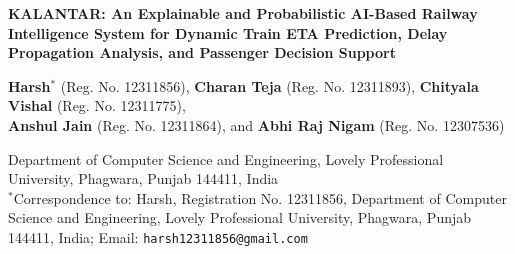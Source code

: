 \documentclass[11pt,a4paper]{article}
\begin{document}
\begin{center}
    {\LARGE \textbf{KALANTAR: An Explainable and Probabilistic AI-Based Railway Intelligence System for Dynamic Train ETA Prediction, Delay Propagation Analysis, and Passenger Decision Support}}
    \vspace{1.0em}

    \textbf{Harsh}$^{*}$ (Reg. No. 12311856), \textbf{Charan Teja} (Reg. No. 12311893), \textbf{Chityala Vishal} (Reg. No. 12311775), \\
    \textbf{Anshul Jain} (Reg. No. 12311864), and \textbf{Abhi Raj Nigam} (Reg. No. 12307536)
    \vspace{0.5em}

    Department of Computer Science and Engineering, Lovely Professional University, Phagwara, Punjab 144411, India \\
    \vspace{0.3em}
    $^{*}$Correspondence to: Harsh, Registration No. 12311856, Department of Computer Science and Engineering, Lovely Professional University, Phagwara, Punjab 144411, India; Email: \texttt{harsh12311856@gmail.com}
\end{center}

\vspace{0.5em}
\end{document}
